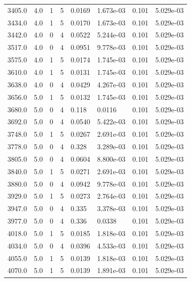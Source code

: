 \documentclass[preview]{standalone}
\begin{document}
{{{{{\begin{tabular}{L{1.2cm}C{1.2cm} C{0.3cm}C{0.5cm} C{1.4cm}C{1.4cm} C{1.4cm}C{1.4cm}}
  3405.0  &   4.0  & 1     &  5 &  0.0169  & 1.673e-03  & 0.101 &  5.029e-03   \\ 
  3434.0  &   4.0  & 1     &  5 &  0.0170  & 1.673e-03  & 0.101 &  5.029e-03   \\ 
  3442.0  &   4.0  & 0     &  4 &  0.0522  & 5.244e-03  & 0.101 &  5.029e-03   \\ 
  3517.0  &   4.0  & 0     &  4 &  0.0951  & 9.778e-03  & 0.101 &  5.029e-03   \\ 
  3575.0  &   4.0  & 1     &  5 &  0.0174  & 1.745e-03  & 0.101 &  5.029e-03   \\ 
  3610.0  &   4.0  & 1     &  5 &  0.0131  & 1.745e-03  & 0.101 &  5.029e-03   \\ 
  3638.0  &   4.0  & 0     &  4 &  0.0429  & 4.267e-03  & 0.101 &  5.029e-03   \\ 
  3656.0  &   5.0  & 1     &  5 &  0.0132  & 1.745e-03  & 0.101 &  5.029e-03   \\ 
  3680.0  &   5.0  & 0     &  4 &  0.118  & 0.0116  & 0.101 &  5.029e-03   \\ 
  3692.0  &   5.0  & 0     &  4 &  0.0540  & 5.422e-03  & 0.101 &  5.029e-03   \\ 
  3748.0  &   5.0  & 1     &  5 &  0.0267  & 2.691e-03  & 0.101 &  5.029e-03   \\ 
  3778.0  &   5.0  & 0     &  4 &  0.328  & 3.289e-03  & 0.101 &  5.029e-03   \\ 
  3805.0  &   5.0  & 0     &  4 &  0.0604  & 8.800e-03  & 0.101 &  5.029e-03   \\ 
  3840.0  &   5.0  & 1     &  5 &  0.0271  & 2.691e-03  & 0.101 &  5.029e-03   \\ 
  3880.0  &   5.0  & 0     &  4 &  0.0942  & 9.778e-03  & 0.101 &  5.029e-03   \\ 
  3929.0  &   5.0  & 1     &  5 &  0.0273  & 2.764e-03  & 0.101 &  5.029e-03   \\ 
  3947.0  &   5.0  & 0     &  4 &  0.335  & 3.378e-03  & 0.101 &  5.029e-03   \\ 
  3977.0  &   5.0  & 0     &  4 &  0.336  & 0.0338  & 0.101 &  5.029e-03   \\ 
  4018.0  &   5.0  & 1     &  5 &  0.0185  & 1.818e-03  & 0.101 &  5.029e-03   \\ 
  4034.0  &   5.0  & 0     &  4 &  0.0396  & 4.533e-03  & 0.101 &  5.029e-03   \\ 
  4055.0  &   5.0  & 1     &  5 &  0.0139  & 1.818e-03  & 0.101 &  5.029e-03   \\ 
  4070.0  &   5.0  & 1     &  5 &  0.0139  & 1.891e-03  & 0.101 &  5.029e-03   \\ 

\end{tabular}}}}}}
\end{document}
